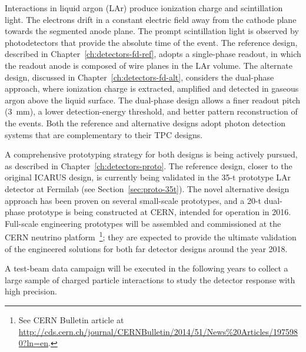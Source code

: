 Interactions in liquid argon (LAr) produce ionization charge and
scintillation light.  The %
electrons drift in a constant electric field
away from the cathode plane towards the segmented anode plane.  The
prompt scintillation light is observed by photodetectors that provide
the absolute time of the event.  The reference design, described in
Chapter~\ref{ch:detectors-fd-ref}, adopts a single-phase readout,
in which the readout anode is composed of wire planes in the LAr
volume.  The alternate design, discussed in
Chapter~\ref{ch:detectors-fd-alt}, considers the dual-phase approach,
where ionization charge is extracted, amplified and detected in
gaseous argon above the liquid surface.  The dual-phase design 
allows a finer readout pitch (3~mm), a lower detection-energy threshold,
and better pattern reconstruction of the events.  
Both the reference and alternative designs adopt photon detection systems that are complementary
to their TPC designs. 

A comprehensive prototyping strategy for both designs is being actively
pursued, as described in Chapter~\ref{ch:detectors-proto}.  The
reference design, closer to the original ICARUS design, is currently
being validated in the 35-t prototype LAr detector at Fermilab (see Section~\ref{sec:proto-35t}).  The
novel alternative design approach has been proven on
several small-scale prototypes, and a 20-t dual-phase
prototype %
is being constructed at CERN, intended for
operation in 2016.  Full-scale engineering prototypes will be
assembled and commissioned at the CERN neutrino platform~\footnote{See CERN Bulletin article at \href{http://cds.cern.ch/journal/CERNBulletin/2014/51/News\%20Articles/1975980?ln=en}{http://cds.cern.ch/journal/CERNBulletin/2014/51/News\%20Articles/1975980?ln=en}.}; they are 
expected to provide the ultimate validation of the engineered solutions
for both far detector designs around the year 2018. 

A test-beam data
campaign will be executed in the following years to collect a large
sample of charged particle interactions to study the detector response
with high precision.  %

